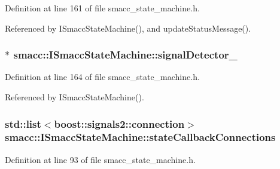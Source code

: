 Definition at line 161 of file smacc\+\_\+state\+\_\+machine.\+h.



Referenced by I\+Smacc\+State\+Machine(), and update\+Status\+Message().

\subsubsection[{\texorpdfstring{signal\+Detector\+\_\+}{signalDetector_}}]{$\ast$ smacc\+::\+I\+Smacc\+State\+Machine\+::signal\+Detector\+\_\+\hspace{0.3cm}{\ttfamily [private]}}\hypertarget{classsmacc_1_1ISmaccStateMachine_a3982eb671f5f001cb047d3a467789986}{}\label{classsmacc_1_1ISmaccStateMachine_a3982eb671f5f001cb047d3a467789986}


Definition at line 164 of file smacc\+\_\+state\+\_\+machine.\+h.



Referenced by I\+Smacc\+State\+Machine().

\subsubsection[{\texorpdfstring{state\+Callback\+Connections}{stateCallbackConnections}}]{\setlength{\rightskip}{0pt plus 5cm}std\+::list$<$boost\+::signals2\+::connection$>$ smacc\+::\+I\+Smacc\+State\+Machine\+::state\+Callback\+Connections}\hypertarget{classsmacc_1_1ISmaccStateMachine_aaf98bb0edaa5d8c84767e4acfad3548d}{}\label{classsmacc_1_1ISmaccStateMachine_aaf98bb0edaa5d8c84767e4acfad3548d}


Definition at line 93 of file smacc\+\_\+state\+\_\+machine.\+h.

